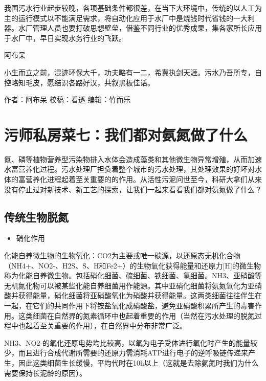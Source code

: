 \documentclass[]{book}
\providecommand{\tightlist}{%
  \setlength{\itemsep}{0pt}\setlength{\parskip}{0pt}}
\begin{document}
我国污水行业起步较晚，各项基础条件都很差，在当下大环境中，传统的以人工为主的运行模式以不能满足需求，将自动化应用于水厂中是烧钱时代省钱的一大利器。水厂管理人员也要打破思想壁垒，借鉴不同行业的优秀成果，集各家所长应用于水厂中，早日实现水务行业的飞跃。

阿布呆

小生而立之前，混迹环保大千，功夫略有一二，希冀执剑天涯。污水乃吾所专，自控略知毛皮，愿结识各路好汉，共叙黑板佳话。

作者：阿布呆
校稿：看透
编辑：竹而乐

\hypertarget{ux6c61ux5e08ux79c1ux623fux83dcux4e03ux6211ux4eecux90fdux5bf9ux6c28ux6c2eux505aux4e86ux4ec0ux4e48}{%
\section{污师私房菜七：我们都对氨氮做了什么}\label{ux6c61ux5e08ux79c1ux623fux83dcux4e03ux6211ux4eecux90fdux5bf9ux6c28ux6c2eux505aux4e86ux4ec0ux4e48}}

氮、磷等植物营养型污染物排入水体会造成藻类和其他微生物异常增殖，从而加速水富营养化过程。污水处理厂担负着整个城市的污水处理，其处理效果的好坏对水体的富营养化进程起着至关重要的的作用。从活性污泥问世至今，科研大拿们从来没有停止过对新技术、新工艺的探索，让我们一起来看看我们都对氨氮做了什么？

\hypertarget{ux4f20ux7edfux751fux7269ux8131ux6c2e}{%
\subsection{传统生物脱氮}\label{ux4f20ux7edfux751fux7269ux8131ux6c2e}}

\begin{itemize}
\tightlist
\item
  硝化作用
\end{itemize}

化能自养微生物的生物氧化：CO2为主要或唯一碳源，以还原态无机化合物（NH4+、NO2-、H2S、S、H和Fe2+）的生物氧化获得能量和还原力{[}H{]}的微生物称为化能自养微生物。包括硝化细菌、硫细菌、铁细菌、氢细菌。NH3、亚硝酸等无机氮化物可以被某些化能自养细菌用作能源。其中亚硝化细菌将氨氮氧化为亚硝酸并获得能量，硝化细菌将亚硝酸氧化为硝酸并获得能量。这两类细菌往往伴生在一起，在它们的共同作用下将铵盐氧化成硝酸盐，避免亚硝酸积累所产生的毒害作用。这类细菌在自然界的氮素循环中也起着重要的作用（当然在污水处理的脱氮过程中也起着至关重要的作用），在自然界中分布非常广泛。

NH3、NO2-的氧化还原电势均比较高，以氧为电子受体进行氧化时产生的能量较少，而且进行合成代谢所需要的还原力需消耗ATP进行电子的逆呼吸链传递来产生，因此这类细菌生长缓慢，平均代时在10h以上（这就是去除氨氮时我们为什么需要保持长泥龄的原因）。
\end{document}
